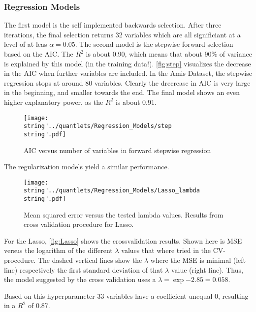 
\subsubsection{Regression Models}
The first model is the self implemented backwards selection. After three iterations, the final selection returns 32 variables which are all significiant at a level of at leas $\alpha=0.05$. 
The second model is the stepwise forward selection based on the AIC. The $R^{2}$ is about 0.90, which means that about 90\% of variance is explained by this model (in the training data!).
\autoref{fig:step} visualizes the decrease in the AIC when further variables are included. In the Amis Dataset, the stepwise regression stops at around 80 variables. Clearly the drecrease in AIC is very large in the beginning, and smaller towards the end. 
The final model shows an even higher explanatory power, as the  $R^{2}$  is about 0.91. 

\begin{figure}[H]
  \centering
\texttt{[image: \\string"../quantlets/Regression\_Models/step\\string".pdf]}
  \caption{AIC versus number of variables in forward stepwise regression}\label{fig:step}
\end{figure}

The regularization models yield a similar performance. 
 
\begin{figure}[H]
  \centering
\texttt{[image: \\string"../quantlets/Regression\_Models/Lasso\_lambda\\string".pdf]}
  \caption{Mean squared error versus the tested lambda values. Results from cross validation procedure for Lasso.}\label{fig:Lasso}
\end{figure}

For the Lasso, \autoref{fig:Lasso} shows the crossvalidation results. Shown here is  MSE versus the logarithm of the different $\lambda$ values that where tried in the CV-procedure. The dashed vertical lines show the $\lambda$ where the MSE is minimal (left line) respectively the first standard deviation of that $\lambda$ value (right line). Thus, the model suggested by the cross validation uses a $\lambda = \exp{-2.85}=0.058$. 

Based on this hyperparameter 33 variables have a coefficient unequal $0$, resulting in a $R^{2}$ of 0.87. 

